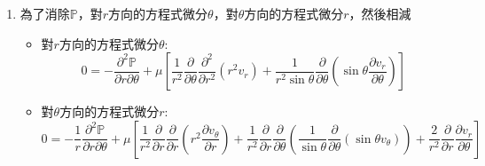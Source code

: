 \documentclass[../main.tex]{subfiles}
\begin{document}
\begin{itemize}
\begin{enumerate}
\begin{itemize}
      \item $r$方向:
      \begin{equation}
        0 = -\frac{\partial \mathbb{P}}{\partial r} + \mu \left[
          \frac{1}{r^2}\frac{\partial^2}{\partial r^2}(r^2 v_r)+\frac{1}{r^2\sin\theta}\frac{\partial}{\partial \theta}\left(
            \sin\theta \frac{\partial v_r}{\partial \theta}\right)
        \right]
      \end{equation}
      \item $\theta$方向:
      \begin{equation}
        0 = -\frac{1}{r}\frac{\partial \mathbb{P}}{\partial \theta} + \mu \left[
          \frac{1}{r^2}\frac{\partial}{\partial r}\left(
            r^2 \frac{\partial v_\theta}{\partial r}
          \right) + \frac{1}{r^2}\frac{\partial}{\partial \theta}\left(
            \frac{1}{\sin\theta}\frac{\partial}{\partial \theta}(\sin\theta v_\theta)
          \right) + \frac{2}{r^2}\frac{\partial v_r}{\partial \theta} 
        \right]
      \end{equation}
    \end{itemize}
    \item 為了消除$\mathbb{P}$，對$r$方向的方程式微分$\theta$，對$\theta$方向的方程式微分$r$，然後相減
    \begin{itemize}
      \item 對$r$方向的方程式微分$\theta$:
      \begin{equation}
        0 = -\frac{\partial^2 \mathbb{P}}{\partial r \partial \theta} + \mu \left[
          \frac{1}{r^2}\frac{\partial}{\partial \theta}\frac{\partial^2}{\partial r^2}(r^2 v_r)+\frac{1}{r^2\sin\theta}\frac{\partial}{\partial \theta}\left(
            \sin\theta \frac{\partial v_r}{\partial \theta}\right)
        \right]
      \end{equation}
      \item 對$\theta$方向的方程式微分$r$:
      \begin{equation}
        0 = -\frac{1}{r}\frac{\partial^2 \mathbb{P}}{\partial r \partial \theta} + \mu \left[
          \frac{1}{r^2}\frac{\partial}{\partial r}\frac{\partial}{\partial r}\left(
            r^2 \frac{\partial v_\theta}{\partial r}
          \right) + \frac{1}{r^2}\frac{\partial}{\partial r}\frac{\partial}{\partial \theta}\left(
            \frac{1}{\sin\theta}\frac{\partial}{\partial \theta}(\sin\theta v_\theta)
          \right) + \frac{2}{r^2}\frac{\partial}{\partial r}\frac{\partial v_r}{\partial \theta} 
        \right]
      \end{equation}

\end{itemize}
\end{enumerate}
\end{itemize}
\end{document}
